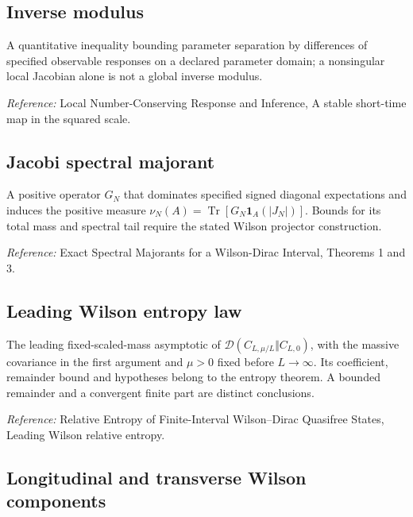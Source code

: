 \documentclass[
  10pt,
  a4paper,
]{article}
\begin{document}
\subsection{Inverse modulus}\label{inverse-modulus}

A quantitative inequality bounding parameter separation by differences of specified observable responses on a declared parameter domain; a nonsingular local Jacobian alone is not a global inverse modulus.

\nopagebreak[4]

\emph{Reference:} Local Number-Conserving Response and Inference, A stable short-time map in the squared scale.

\subsection{Jacobi spectral majorant}\label{jacobi-spectral-majorant}

A positive operator \(G_N\) that dominates specified signed diagonal expectations and induces the positive measure \(\nu_N(A)=\operatorname{Tr}[G_N\mathbf1_A(|J_N|)]\). Bounds for its total mass and spectral tail require the stated Wilson projector construction.

\nopagebreak[4]

\emph{Reference:} Exact Spectral Majorants for a Wilson-Dirac Interval, Theorems 1 and 3.

\subsection{Leading Wilson entropy law}\label{leading-wilson-entropy-law}

The leading fixed-scaled-mass asymptotic of \(\mathcal D(C_{L,\mu/L}\Vert C_{L,0})\), with the massive covariance in the first argument and \(\mu>0\) fixed before \(L\to\infty\). Its coefficient, remainder bound and hypotheses belong to the entropy theorem. A bounded remainder and a convergent finite part are distinct conclusions.

\nopagebreak[4]

\emph{Reference:} Relative Entropy of Finite-Interval Wilson--Dirac Quasifree States, Leading Wilson relative entropy.

\subsection{Longitudinal and transverse Wilson components}\label{longitudinal-and-transverse-wilson-components}
\end{document}
